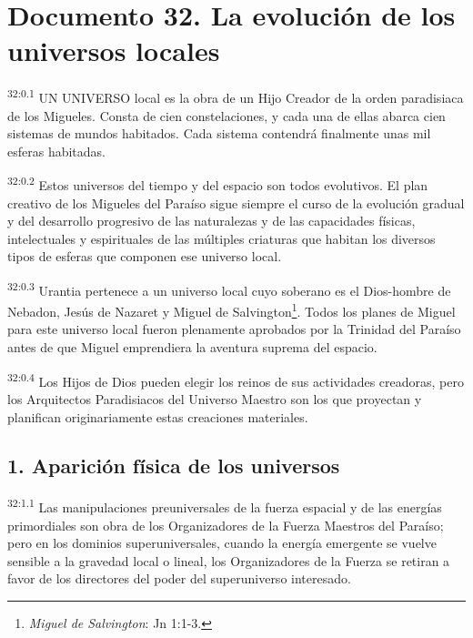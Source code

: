 \chapter{Documento 32. La evolución de los universos locales}
\par
\textsuperscript{32:0.1} UN UNIVERSO local es la obra de un Hijo Creador de la orden paradisiaca de los Migueles. Consta de cien constelaciones, y cada una de ellas abarca cien sistemas de mundos habitados. Cada sistema contendrá finalmente unas mil esferas habitadas.

\par
\textsuperscript{32:0.2} Estos universos del tiempo y del espacio son todos evolutivos. El plan creativo de los Migueles del Paraíso sigue siempre el curso de la evolución gradual y del desarrollo progresivo de las naturalezas y de las capacidades físicas, intelectuales y espirituales de las múltiples criaturas que habitan los diversos tipos de esferas que componen ese universo local.

\par
\textsuperscript{32:0.3} Urantia pertenece a un universo local cuyo soberano es el Dios-hombre de Nebadon, Jesús de Nazaret y Miguel de Salvington\footnote{\textit{Miguel de Salvington}: Jn 1:1-3.}. Todos los planes de Miguel para este universo local fueron plenamente aprobados por la Trinidad del Paraíso antes de que Miguel emprendiera la aventura suprema del espacio.

\par
\textsuperscript{32:0.4} Los Hijos de Dios pueden elegir los reinos de sus actividades creadoras, pero los Arquitectos Paradisiacos del Universo Maestro son los que proyectan y planifican originariamente estas creaciones materiales.

\section*{1. Aparición física de los universos}
\par
\textsuperscript{32:1.1} Las manipulaciones preuniversales de la fuerza espacial y de las energías primordiales son obra de los Organizadores de la Fuerza Maestros del Paraíso; pero en los dominios superuniversales, cuando la energía emergente se vuelve sensible a la gravedad local o lineal, los Organizadores de la Fuerza se retiran a favor de los directores del poder del superuniverso interesado.

